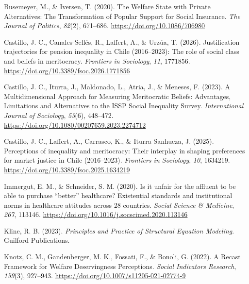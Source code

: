 \documentclass[
  13pt,
]{article}
\newlength{\cslhangindent}
\newenvironment{CSLReferences}[2] %
 {\begin{list}{}{%
  \setlength{\itemindent}{0pt}
  \setlength{\leftmargin}{0pt}
  \setlength{\parsep}{0pt}
  \ifodd #1
   \setlength{\leftmargin}{\cslhangindent}
   \setlength{\itemindent}{-1\cslhangindent}
  \fi
  \setlength{\itemsep}{#2\baselineskip}}}
 {\end{list}}
\begin{document}
\label{refs}
\begin{CSLReferences}{1}{0}
Busemeyer, M., \& Iversen, T. (2020). The {Welfare State} with {Private
Alternatives}: {The Transformation} of {Popular Support} for {Social
Insurance}. \emph{The Journal of Politics}, \emph{82}(2), 671--686.
\url{https://doi.org/10.1086/706980}

Castillo, J. C., Canales-Sellés, R., Laffert, A., \& Urzúa, T. (2026).
Justification trajectories for pension inequality in {Chile}
(2016--2023): The role of social class and beliefs in meritocracy.
\emph{Frontiers in Sociology}, \emph{11}, 1771856.
\url{https://doi.org/10.3389/fsoc.2026.1771856}

Castillo, J. C., Iturra, J., Maldonado, L., Atria, J., \& Meneses, F.
(2023). A {Multidimensional Approach} for {Measuring Meritocratic
Beliefs}: {Advantages}, {Limitations} and {Alternatives} to the {ISSP
Social Inequality Survey}. \emph{International Journal of Sociology},
\emph{53}(6), 448--472.
\url{https://doi.org/10.1080/00207659.2023.2274712}

Castillo, J. C., Laffert, A., Carrasco, K., \& Iturra-Sanhueza, J.
(2025). Perceptions of inequality and meritocracy: Their interplay in
shaping preferences for market justice in {Chile} (2016--2023).
\emph{Frontiers in Sociology}, \emph{10}, 1634219.
\url{https://doi.org/10.3389/fsoc.2025.1634219}

Immergut, E. M., \& Schneider, S. M. (2020). Is it unfair for the
affluent to be able to purchase {``better''} healthcare? {Existential}
standards and institutional norms in healthcare attitudes across 28
countries. \emph{Social Science \& Medicine}, \emph{267}, 113146.
\url{https://doi.org/10.1016/j.socscimed.2020.113146}

Kline, R. B. (2023). \emph{Principles and {Practice} of {Structural
Equation Modeling}}. Guilford Publications.

Knotz, C. M., Gandenberger, M. K., Fossati, F., \& Bonoli, G. (2022). A
{Recast Framework} for {Welfare Deservingness Perceptions}. \emph{Social
Indicators Research}, \emph{159}(3), 927--943.
\url{https://doi.org/10.1007/s11205-021-02774-9}


\end{CSLReferences}
\end{document}
